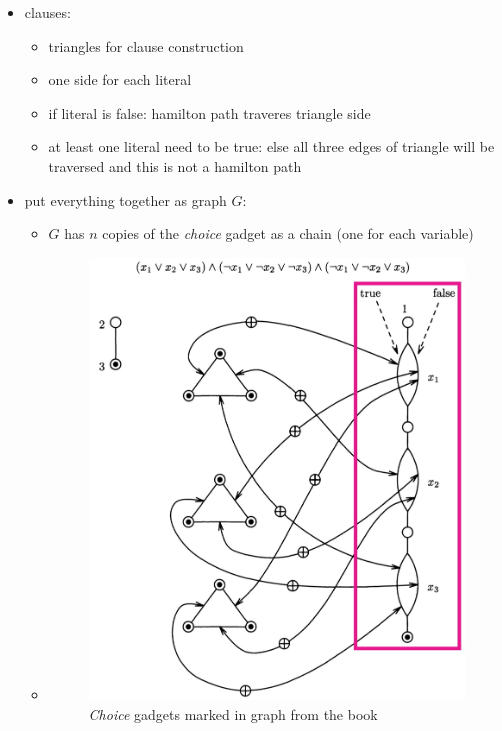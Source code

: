 \documentclass[a4]{scrartcl}
\begin{document}
\begin{itemize}
\item clauses:
\begin{itemize}
\item triangles for clause construction
\item one side for each literal
\item if literal is false: hamilton path traveres triangle side
\item at least one literal need to be true: else all three edges of triangle will be traversed and this is not a hamilton path 
\end{itemize}

\item put everything together as graph $G$:
\begin{itemize}
\item $G$ has $n$ copies of the \textit{choice} gadget as a chain (one for each variable)
\item[]
\begin{figure}[H]
\begin{center}
\includegraphics[scale=0.4]{choicegadgets.jpg}
\end{center}
\caption{\textit{Choice} gadgets marked in graph from the book \cite{book}}
\end{figure}
\end{itemize}


\end{itemize}
\end{document}
